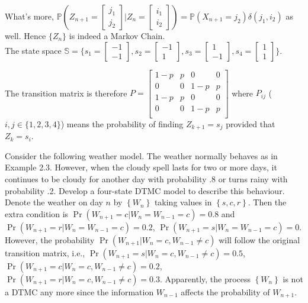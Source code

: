 \documentclass[  11pt]{article}
\newcommand{\p}{ {\Pr}}
\newcommand{\set}[1]{\left\{#1\right\}}
\begin{document}
\begin{ExerciseList}
\begin{itemize}
What's more, $\mathbb{P}(Z_{n+1} = \begin{bmatrix} j_1 \\ j_2 \end{bmatrix} |Z_{n} = \begin{bmatrix} i_1 \\ i_2\end{bmatrix}) = \mathbb{P}(X_{n+1} = j_2) \delta(j_1,i_2)$ as well. Hence $\{Z_n\}$ is indeed a Markov Chain. \\

The state space $\mathbb{S} = \{s_1 = \begin{bmatrix} -1 \\ -1\end{bmatrix}, s_2 = \begin{bmatrix} -1 \\ 1\end{bmatrix}, s_3 = \begin{bmatrix} 1 \\ -1\end{bmatrix}, s_4 = \begin{bmatrix} 1 \\ 1\end{bmatrix}\}$.

The transition matrix is therefore $P = \begin{bmatrix}
1-p & p & 0 & 0 \\
0 & 0 & 1-p & p \\
1-p & p & 0 & 0 \\
0 & 0 & 1-p & p \\
\end{bmatrix}$ where $P_{ij}$ ($i,j\in\{1,2,3,4\}$) means the probability of finding $Z_{k+1} = s_j$ provided that $Z_{k} = s_i$.\\
 
  
 \end{itemize}


\Exercise[origin={textbook p51, 2.13}]  Consider the following weather model. The weather normally behaves as in
Example 2.3. However, when the cloudy spell lasts for two or more days, it continues to be cloudy for another day with probability .8 or turns rainy with probability .2. Develop a four-state DTMC model to describe this behaviour.\\

\Answer 
Denote the weather on day $n$ by $\set{W_n}$ taking values in    $\set{s, c, r }$.
Then the extra condition is $\p(W_{n+1} =c \vert W_{n} =W_{n-1}=c)=0.8$
and $\p(W_{n+1} = r \vert W_{n} =W_{n-1}=c)=0.2$,
$\p(W_{n+1} =s \vert W_{n} =W_{n-1}=c)=0$.
However, 
the probability $ \p(W_{n+1}   \vert W_{n} =c, W_{n-1}\neq c)$
 will follow the original transition matrix, i.e.,
 $ \p(W_{n+1}=s   \vert W_{n} =c, W_{n-1}\neq c)=0.5$,
 $ \p(W_{n+1}=c   \vert W_{n} =c, W_{n-1}\neq c)=0.2$,
 $ \p(W_{n+1}=r   \vert W_{n} =c, W_{n-1}\neq c)=0.3$.
Apparently, the process $\set{W_n}$ is not a DTMC any more
since the information $W_{n-1}$ affects the   probability of $W_{n+1}$. 
\par



\end{ExerciseList}
\end{document}
